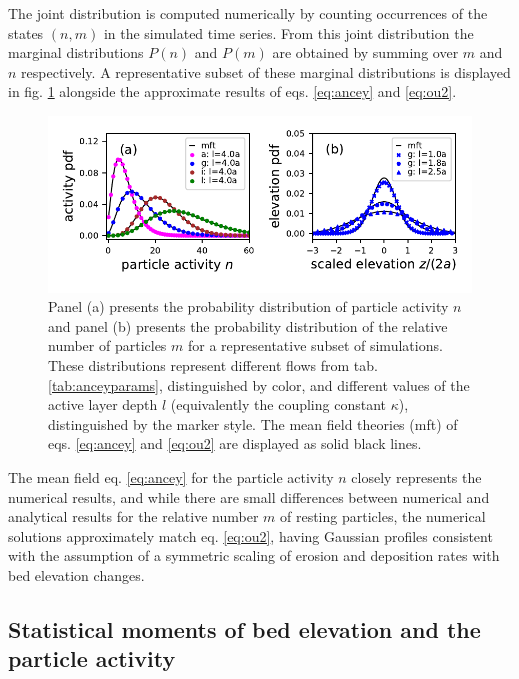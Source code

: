The joint distribution is computed numerically by counting occurrences of the states $(n,m)$ in the simulated time series.
From this joint distribution the marginal distributions $P(n)$ and $P(m)$ are obtained by summing over $m$ and $n$ respectively.
A representative subset of these marginal distributions is displayed in fig. \ref{fig:pdfs} alongside the approximate results of eqs. \ref{eq:ancey} and \ref{eq:ou2}.
\begin{figure}[!htbp]
	\includegraphics[width=\linewidth,keepaspectratio]{./figures/ch3/distributions.pdf}
	\caption{Panel (a) presents the probability distribution of particle activity $n$ and panel (b) presents the probability distribution of the relative number of particles $m$ for a representative subset of simulations. These distributions represent different flows from tab. \ref{tab:anceyparams}, distinguished by color, and different values of the active layer depth $l$ (equivalently the coupling constant $\kappa$), distinguished by the marker style. The mean field theories (mft) of eqs. \ref{eq:ancey} and \ref{eq:ou2} are displayed as solid black lines.}
	\label{fig:pdfs}
\end{figure}
The mean field eq. \ref{eq:ancey} for the particle activity $n$ closely represents the numerical results, and while there are small differences between numerical and analytical results for the relative number $m$ of resting particles, the numerical solutions approximately match eq. \ref{eq:ou2}, having Gaussian profiles consistent with the assumption of a symmetric scaling of erosion and deposition rates with bed elevation changes. 


\subsection{Statistical moments of bed elevation and the particle activity}
\label{sec:elemom}

